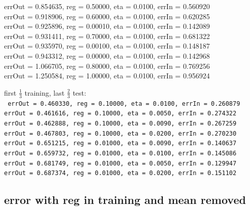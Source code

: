 \begin{appendices}
{  errOut = 0.854635, reg = 0.50000, eta = 0.0100, errIn = 0.560920 \\
  errOut = 0.918906, reg = 0.60000, eta = 0.0100, errIn = 0.620285 \\
  errOut = 0.925896, reg = 0.00010, eta = 0.0100, errIn = 0.142089 \\
  errOut = 0.931411, reg = 0.70000, eta = 0.0100, errIn = 0.681322 \\
  errOut = 0.935970, reg = 0.00100, eta = 0.0100, errIn = 0.148187 \\
  errOut = 0.943312, reg = 0.00000, eta = 0.0100, errIn = 0.142968 \\
  errOut = 1.066705, reg = 0.80000, eta = 0.0100, errIn = 0.769256 \\
  errOut = 1.250584, reg = 1.00000, eta = 0.0100, errIn = 0.956924 \\
}

\noindent first $\frac{1}{3}$ training, last $\frac{2}{3}$ test: \\
\texttt{
  errOut = 0.460330, reg = 0.10000, eta = 0.0100, errIn = 0.260879 \\
  errOut = 0.461616, reg = 0.10000, eta = 0.0050, errIn = 0.274322 \\
  errOut = 0.462888, reg = 0.10000, eta = 0.0090, errIn = 0.267259 \\
  errOut = 0.467803, reg = 0.10000, eta = 0.0200, errIn = 0.270230 \\
  errOut = 0.651215, reg = 0.01000, eta = 0.0090, errIn = 0.140637 \\
  errOut = 0.659732, reg = 0.01000, eta = 0.0100, errIn = 0.145086 \\
  errOut = 0.681749, reg = 0.01000, eta = 0.0050, errIn = 0.129947 \\
  errOut = 0.687374, reg = 0.01000, eta = 0.0200, errIn = 0.151102
}

\subsection{error with reg in training and mean removed}


\end{appendices}
